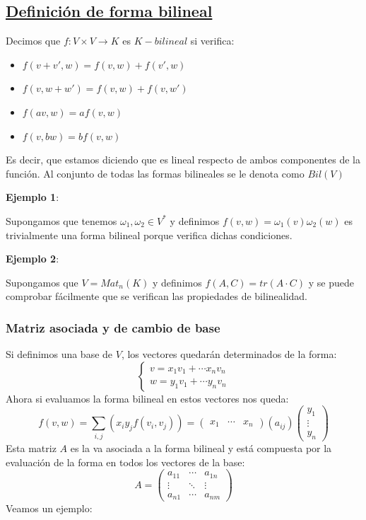 \documentclass[10pt,a4paper,openright]{book}
\begin{document}
\subsection*{\underline{Definición de forma bilineal}}

Decimos que $f: V\times V\rightarrow K$ es $K-bilineal$ si verifica:
\begin{itemize}
\item $f(v+v',w) = f(v,w)+f(v',w)$
\item $f(v, w+w') = f(v,w)+f(v,w')$
\item $f(av, w)= a f(v,w)$
\item $f(v,bw)=bf(v,w)$
\end{itemize}
Es decir, que estamos diciendo que es lineal respecto de ambos componentes de la función. Al conjunto de todas las formas bilineales se le denota como $Bil(V)$

\textbf{Ejemplo 1}:

Supongamos que tenemos $\omega_1, \omega_2\in V^*$ y definimos $f(v,w)=\omega_1(v)\omega_2(w)$ es trivialmente una forma bilineal porque verifica dichas condiciones.

\textbf{Ejemplo 2}:

Supongamos que $V=Mat_n(K)$ y definimos $f(A,C)=tr(A\cdot C)$ y se puede comprobar fácilmente que se verifican las propiedades de bilinealidad.

\subsubsection*{Matriz asociada y de cambio de base}
Si definimos una base de $V$, los vectores quedarán determinados de la forma:
$$\begin{cases}v=x_1v_1+\cdots x_nv_n \\ w=y_1v_1+\cdots y_nv_n\end{cases}$$
Ahora si evaluamos la forma bilineal en estos vectores nos queda:
$$f(v,w)=\sum_{i,j} (x_iy_jf(v_i,v_j)) = \begin{pmatrix} x_1 & \cdots & x_n\end{pmatrix}(a_{ij})\begin{pmatrix} y_1 \\ \vdots \\ y_n \end{pmatrix} $$
Esta matriz $A$ es la va asociada a la forma bilineal y está compuesta por la evaluación de la forma en todos los vectores de la base:
$$A=\begin{pmatrix} a_{11} & \cdots & a_{1n} \\ \vdots & \ddots & \vdots \\ a_{n1} & \cdots & a_{nm} \end{pmatrix}$$
Veamos un ejemplo:
\end{document}
